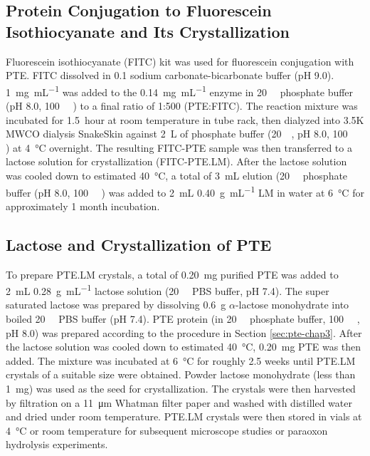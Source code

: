 \begin{refsection}
\subsection{Protein Conjugation to Fluorescein Isothiocyanate and Its
Crystallization}

Fluorescein isothiocyanate (FITC) kit was used for fluorescein conjugation with
PTE. FITC dissolved in \SI{0.1}{\Molar} sodium carbonate-bicarbonate buffer (pH
9.0).  \SI{1}{\mg\per\mL} was added to the \SI{0.14}{\mg\per\mL} enzyme in
\SI{20}{\milli\Molar} phosphate buffer (pH 8.0, \SI{100}{\micro\Molar}
) to a final ratio of 1:500 (PTE:FITC). The reaction mixture was
incubated for \SI{1.5}{hour} at room temperature in tube rack, then dialyzed
into 3.5K MWCO dialysis SnakeSkin against \SI{2}{\liter} of phosphate buffer
(\SI{20}{\milli\Molar}, pH 8.0, \SI{100}{\micro\Molar} ) at
\SI{4}{\celsius} overnight.  The resulting FITC-PTE sample was then transferred
to a lactose solution for crystallization (FITC-PTE.LM). After the lactose
solution was cooled down to estimated \SI{40}{\celsius}, a total of \SI{3}{\mL} elution
(\SI{20}{\milli\Molar} phosphate buffer (pH 8.0, \SI{100}{\micro\Molar}
) was added to \SI{2}{\mL} \SI{0.40}{\gram\per\mL} LM in water at
\SI{6}{\celsius} for approximately 1 month incubation.

\subsection{Lactose and Crystallization of PTE}
\label{sec:mm-xal}

To prepare PTE.LM crystals, a total of \SI{0.20}{\milli\gram} purified PTE was
added to \SI{2}{\mL} \SI{0.28}{\gram\per\mL} lactose solution
(\SI{20}{\milli\Molar} PBS buffer, pH 7.4). The super saturated lactose was
prepared by dissolving \SI{0.6}{\gram} $\alpha$-lactose monohydrate into boiled
\SI{20}{\milli\Molar} PBS buffer (pH 7.4). PTE protein (in
\SI{20}{\milli\Molar} phosphate buffer, \SI{100}{\micro\Molar} , pH
8.0) was prepared according to the procedure in Section \ref{sec:pte-chap3}.
After the lactose solution was cooled down to estimated \SI{40}{\celsius},
\SI{0.20}{\milli\gram} PTE was then added. The mixture was incubated at
\SI{6}{\celsius} for roughly 2.5 weeks until PTE.LM crystals of a suitable size
were obtained.  Powder lactose monohydrate (less than \SI{1}{\mg}) was used as
the seed for crystallization. The crystals were then harvested by filtration on
a \SI{11}{\micro\meter} Whatman filter paper and washed with distilled water
and dried under room temperature. PTE.LM crystals were then stored in vials at
\SI{4}{\celsius} or room temperature for subsequent microscope studies or
paraoxon hydrolysis experiments.


\end{refsection}
